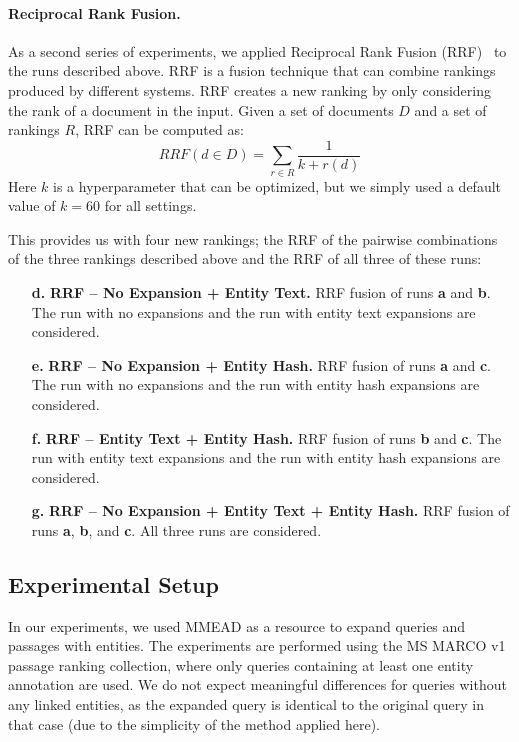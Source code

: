 \paragraph{Reciprocal Rank Fusion.} As a second series of experiments, we applied Reciprocal Rank Fusion (RRF)~\citep{10.1145/1571941.1572114} to the runs described above. RRF is a fusion technique that can combine rankings produced by different systems. RRF creates a new ranking by only considering the rank of a document in the input. Given a set of documents $D$ and a set of rankings $R$, RRF can be computed as: 
\begin{equation}
	RRF(d \in D) = \sum_{r\in R}\frac{1}{k + r(d)}
\end{equation}
Here $k$ is a hyperparameter that can be optimized, but we simply used a default value of $k=60$ for all settings.

This provides us with four new rankings; the RRF of the pairwise combinations of the three rankings described above and the RRF of all three of these runs:
\begin{itemize}
	\item[\textbf{d.}] \textbf{RRF -- No Expansion + Entity Text.} RRF fusion of runs \textbf{a} and \textbf{b}. The run with no expansions and the run with entity text expansions are considered.
	\item[\textbf{e.}] \textbf{RRF -- No Expansion + Entity Hash.} RRF fusion of runs \textbf{a} and \textbf{c}. The run with no expansions and the run with entity hash expansions are considered.
	\item[\textbf{f.}] \textbf{RRF -- Entity Text + Entity Hash.}  RRF fusion of runs \textbf{b} and \textbf{c}. The run with entity text expansions and the run with entity hash expansions are considered.
	\item[\textbf{g.}] \textbf{RRF -- No Expansion + Entity Text + Entity Hash.} RRF fusion of runs \textbf{a}, \textbf{b}, and \textbf{c}. All three runs are considered. 
\end{itemize}

\subsection{Experimental Setup}

In our experiments, we used MMEAD as a resource to expand queries and passages with entities. The experiments are performed using the MS MARCO v1 passage ranking collection, where only queries containing at least one entity annotation are used. We do not expect meaningful differences for queries without any linked entities, as the expanded query is identical to the original query in that case (due to the simplicity of the method applied here). 

